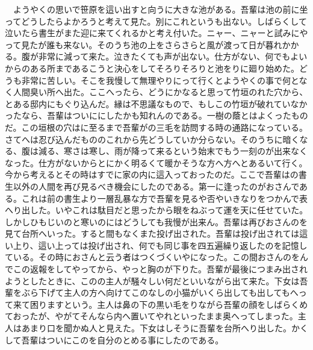 \documentclass[a5j]{ltjbook}
\begin{document}
　ようやくの思いで笹原を這い出すと向うに大きな池がある。吾輩は池の前に坐ってどうしたらよかろうと考えて見た。別にこれというも出ない。しばらくして泣いたら書生がまた迎に来てくれるかと考え付いた。ニャー、ニャーと試みにやって見たが誰も来ない。そのうち池の上をさらさらと風が渡って日が暮れかかる。腹が非常に減って来た。泣きたくても声が出ない。仕方がない、何でもよいからのある所まであるこうと決心をしてそろりそろりと池をりに廻り始めた。どうも非常に苦しい。そこを我慢して無理やりにって行くとようやくの事で何となく人間臭い所へ出た。ここへったら、どうにかなると思って竹垣のれた穴から、とある邸内にもぐり込んだ。縁は不思議なもので、もしこの竹垣が破れていなかったなら、吾輩はついににしたかも知れんのである。一樹の蔭とはよくったものだ。この垣根の穴はに至るまで吾輩がの三毛を訪問する時の通路になっている。さてへは忍び込んだもののこれから先どうしていか分らない。そのうちに暗くなる、腹は減る、寒さは寒し、雨が降って来るという始末でもう一刻のが出来なくなった。仕方がないからとにかく明るくて暖かそうな方へ方へとあるいて行く。今から考えるとその時はすでに家の内に這入っておったのだ。ここで吾輩はの書生以外の人間を再び見るべき機会にしたのである。第一に逢ったのがおさんである。これは前の書生より一層乱暴な方で吾輩を見るや否やいきなりをつかんで表へり出した。いやこれは駄目だと思ったから眼をねぶって運を天に任せていた。しかしひもじいのと寒いのにはどうしても我慢が出来ん。吾輩は再びおさんのを見て台所へいった。すると間もなくまた投げ出された。吾輩は投げ出されては這い上り、這い上っては投げ出され、何でも同じ事を四五遍繰り返したのを記憶している。その時におさんと云う者はつくづくいやになった。この間おさんのをんでこの返報をしてやってから、やっと胸のが下りた。吾輩が最後につまみ出されようとしたときに、このの主人が騒々しい何だといいながら出て来た。下女は吾輩をぶら下げて主人の方へ向けてこのなしの小猫がいくら出しても出してもへって来て困りますという。主人は鼻の下の黒い毛をりながら吾輩の顔をしばらくめておったが、やがてそんなら内へ置いてやれといったまま奥へってしまった。主人はあまり口を聞かぬ人と見えた。下女はしそうに吾輩を台所へり出した。かくして吾輩はついにこのを自分のとめる事にしたのである。 \newline
\end{document}
